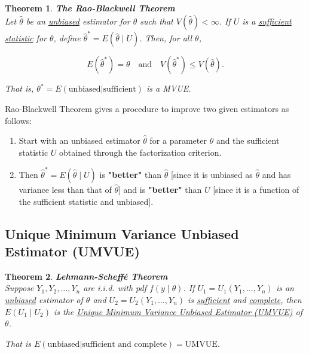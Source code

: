 \documentclass[a4paper,12pt]{article}
\theoremstyle{nonitalic}
\newtheorem{theorem}{Theorem}[subsection]
\begin{document}
    \begin{theorem} \textbf{The Rao-Blackwell Theorem}\\
        Let \(\hat{\theta}\) be an \underline{unbiased} estimator for \(\theta\) such that \(V(\hat{\theta}) < \infty\). If \(U\) is a \underline{sufficient statistic} for \(\theta\), define \(\hat{\theta}^* = E(\hat{\theta} \mid U)\). Then, for all \(\theta\),
        
        \[
            E(\hat{\theta}^*) = \theta \quad \text{and} \quad V(\hat{\theta}^*) \leq V(\hat{\theta}).
        \]

        That is, $\theta^* = E(\text{unbiased}|\text{sufficient})$ is a MVUE.
    \end{theorem}

    \bigskip

    Rao-Blackwell Theorem gives a procedure to improve two given estimators as follows:

    \begin{enumerate}
        \item Start with an unbiased estimator \(\hat{\theta}\) for a parameter \(\theta\) and the sufficient statistic \(U\) obtained through the factorization criterion.
    
        \item Then \(\hat{\theta}^* = E(\hat{\theta} \mid U)\) is \textbf{"better"} than \(\hat{\theta}\) [since it is unbiased as \(\hat{\theta}\) and has variance less than that of \(\hat{\theta}\)] and is \textbf{"better"} than \(U\) [since it is a function of the sufficient statistic and unbiased].
    \end{enumerate}

    \newpage

    \subsection{Unique Minimum Variance Unbiased Estimator (UMVUE)}

    \begin{theorem} \textbf{Lehmann-Scheffé Theorem}\\
        Suppose \( Y_1, Y_2, \ldots, Y_n \) are i.i.d. with pdf \( f(y \mid \theta) \). If \( U_1 = U_1(Y_1, \ldots, Y_n) \) is an \underline{unbiased} estimator of \(\theta\) and \( U_2 = U_2(Y_1, \ldots, Y_n) \) is \underline{sufficient} and \underline{complete}, then \( E(U_1 \mid U_2) \) is the \underline{Unique Minimum Variance Unbiased Estimator (UMVUE)} of \(\theta\).

        \bigskip

        That is \(E(\text{unbiased}|\text{sufficient and complete}) = \text{UMVUE}\).
    \end{theorem}
\end{document}

